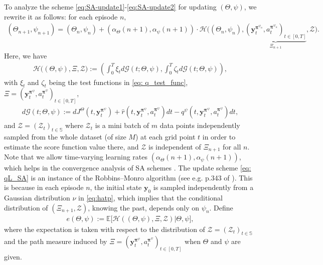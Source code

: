 \documentclass[11pt]{article}
\newcommand{\bm}[1]{\boldsymbol{#1}}
\newcommand{\bpi}{\boldsymbol{\pi}}
\begin{document}
To analyze the scheme \eqref{eq:SA-update1}-\eqref{eq:SA-update2} for updating $(\Theta, \psi)$, we rewrite it as follows: for each episode $n,$
\begin{align}\label{eq: qL_SA}
    \left(\Theta_{n + 1}, \psi_{n + 1}\right) = \left(\Theta_{n}, \psi_{n}\right) + \left(\alpha_{\Theta}(n + 1), \alpha_{\psi}(n + 1)\right)\cdot\mathcal{H}\bigg((\Theta_{n}, \psi_{n}), \underbrace{(\mathbf{y}_t^{\bpi^{\psi_n}}, a_t^{\bpi^{\psi_n}})_{t \in [0, T]}}_{\Xi_{n + 1}}, \mathcal{Z}\bigg).
\end{align}
Here, we have %
\begin{align} \label{eq:H-SA}
    \mathcal{H}\big((\Theta, \psi), \Xi, \mathcal{Z} \big) := \left(\int_{0}^T\xi_t d \mathcal{G}(t; \Theta, \psi), \int_{0}^T\zeta_t d \mathcal{G}(t; \Theta, \psi)\right),
\end{align}
with $\xi_t$ and $\zeta_t$ being the test functions in \eqref{eq: q_test_func}, $\Xi =(\mathbf{y}_t^{\bpi^{\psi}}, a_t^{\bpi^{\psi}})_{t\in[0, T]}$,
\begin{align*}
    d \mathcal{G}(t; \Theta, \psi):=  dJ^{\Theta} (t, \mathbf{y}_t^{\bm\pi^{\psi}}) +  \hat r(t, \mathbf{y}_t^{\bpi^{\psi}}, a_t^{\bpi^{\psi}}) dt - q^{\psi}(t, \mathbf{y}_{t}^{\bpi^{\psi}}, a_t^{\bpi^{\psi}}) dt,
\end{align*}
and $\mathcal{Z} = (\mathcal{Z}_t)_{t \in \mathbb{S}}$ where $\mathcal{Z}_t$ is a mini batch of $m$ data points independently sampled from the whole dataset (of size $M$)  at each grid point $t$ in order to estimate the score function value there, {and $\mathcal{Z}$ is independent of $\Xi_{n + 1}$ for all $n$.}
Note that we allow time-varying learning rates  $\left(\alpha_{\Theta}(n + 1), \alpha_{\psi}(n + 1)\right)$, which helps in the convergence analysis of SA schemes \citep{kushner2003stochastic}.
The update scheme \eqref{eq: qL_SA} is an instance of the Robbins--Monro algorithm (see e.g. p.343 of \citealp{benveniste2012adaptive}). This is because in each episode $n$, the initial state $\mathbf{y}_0$ is sampled independently from a Gaussian distribution $\nu$ in \eqref{eq:hatp}, which implies that
the conditional distribution of $(\Xi_{n+1}, \mathcal{Z})$, knowing the past, %
depends only on $\psi_n$.
Define
\begin{align*}
    e(\Theta, \psi):= \mathbb{E} \big[\mathcal{H}((\Theta, \psi), \Xi,  \mathcal{Z}) \big| \Theta, \psi \big],
\end{align*}
where the expectation is taken with respect to the distribution of $\mathcal{Z} = (\mathcal{Z}_t)_{t \in \mathbb{S}}$ and the path measure induced by $\Xi=(\mathbf{y}_t^{\bpi^{\psi}}, a_t^{\bpi^{\psi}})_{t\in[0, T]}$ when $\Theta$ and $\psi$ are given.
\end{document}
